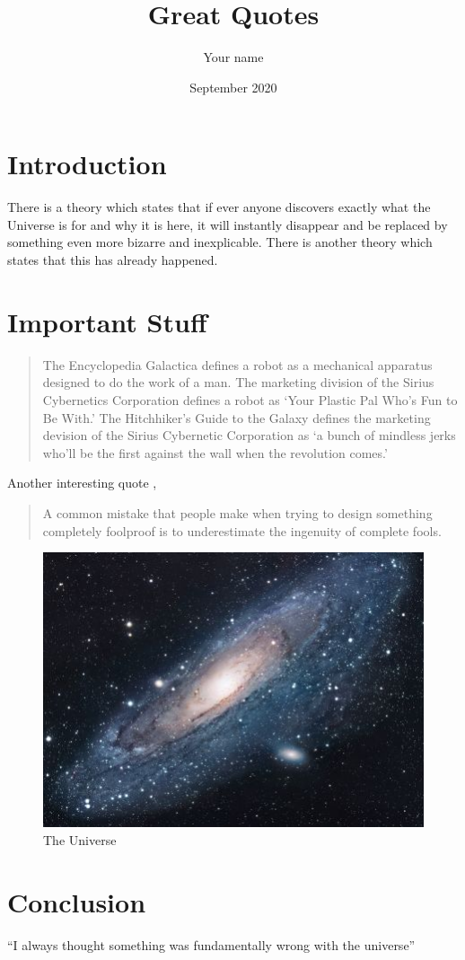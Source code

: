 \documentclass{article}
\title{Great Quotes}
\author{Your name}
\date{September 2020}
\begin{document}
\maketitle

\section{Introduction}
There is a theory which states that if ever anyone discovers exactly what the Universe is for and why it is here, it will instantly disappear and be replaced by something even more bizarre and inexplicable.
There is another theory which states that this has already happened.

\section{Important Stuff}

\begin{quote}
The Encyclopedia Galactica defines a robot as a mechanical apparatus designed to do the work of a man. The marketing division of the Sirius Cybernetics Corporation defines a robot as `Your Plastic Pal Who's Fun to Be With.' The Hitchhiker's Guide to the Galaxy defines the marketing devision of the Sirius Cybernetic Corporation as `a bunch of mindless jerks who'll be the first against the wall when the revolution comes.'
\end{quote}

Another interesting quote \cite{adams2009mostly},
\begin{quote}
A common mistake that people make when trying to design something completely foolproof is to underestimate the ingenuity of complete fools.
\end{quote}

\begin{figure}[h!]
\centering
\includegraphics[scale=1.7]{universe}
\caption{The Universe}
\label{fig:universe}
\end{figure}

\section{Conclusion}
``I always thought something was fundamentally wrong with the universe'' \citep{adams1995hitchhiker}



\end{document}
